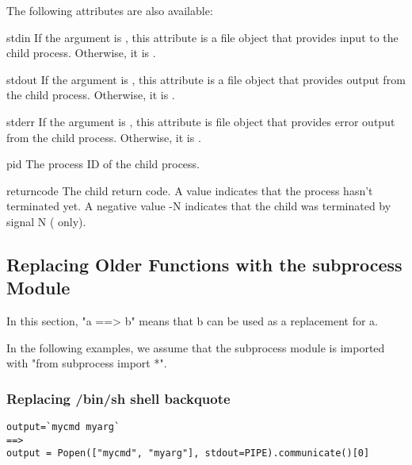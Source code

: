 The following attributes are also available:

\begin{memberdesc}{stdin}
If the  argument is , this attribute is a file
object that provides input to the child process.  Otherwise, it is
.
\end{memberdesc}

\begin{memberdesc}{stdout}
If the  argument is , this attribute is a file
object that provides output from the child process.  Otherwise, it is
.
\end{memberdesc}

\begin{memberdesc}{stderr}
If the  argument is , this attribute is file
object that provides error output from the child process.  Otherwise,
it is .
\end{memberdesc}

\begin{memberdesc}{pid}
The process ID of the child process.
\end{memberdesc}

\begin{memberdesc}{returncode}
The child return code.  A  value indicates that the process
hasn't terminated yet.  A negative value -N indicates that the child
was terminated by signal N (\UNIX{} only).
\end{memberdesc}


\subsection{Replacing Older Functions with the subprocess Module}

In this section, "a ==> b" means that b can be used as a replacement
for a.


In the following examples, we assume that the subprocess module is
imported with "from subprocess import *".

\subsubsection{Replacing /bin/sh shell backquote}

\begin{verbatim}
output=`mycmd myarg`
==>
output = Popen(["mycmd", "myarg"], stdout=PIPE).communicate()[0]
\end{verbatim}

